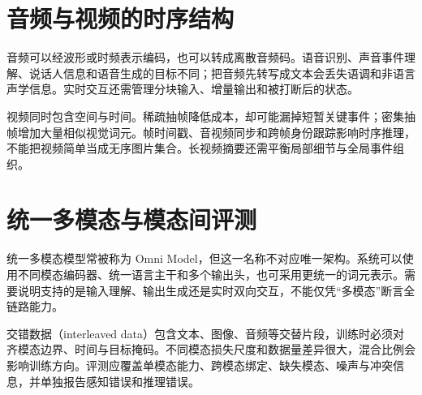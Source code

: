 \section{音频与视频的时序结构}

音频可以经波形或时频表示编码，也可以转成离散音频码。语音识别、声音事件理解、说话人信息和语音生成的目标不同；把音频先转写成文本会丢失语调和非语言声学信息。实时交互还需管理分块输入、增量输出和被打断后的状态。

视频同时包含空间与时间。稀疏抽帧降低成本，却可能漏掉短暂关键事件；密集抽帧增加大量相似视觉词元。帧时间戳、音视频同步和跨帧身份跟踪影响时序推理，不能把视频简单当成无序图片集合。长视频摘要还需平衡局部细节与全局事件组织。

\section{统一多模态与模态间评测}

统一多模态模型常被称为 Omni Model，但这一名称不对应唯一架构。系统可以使用不同模态编码器、统一语言主干和多个输出头，也可采用更统一的词元表示。需要说明支持的是输入理解、输出生成还是实时双向交互，不能仅凭“多模态”断言全链路能力。

交错数据（interleaved data）包含文本、图像、音频等交替片段，训练时必须对齐模态边界、时间与目标掩码。不同模态损失尺度和数据量差异很大，混合比例会影响训练方向。评测应覆盖单模态能力、跨模态绑定、缺失模态、噪声与冲突信息，并单独报告感知错误和推理错误。

